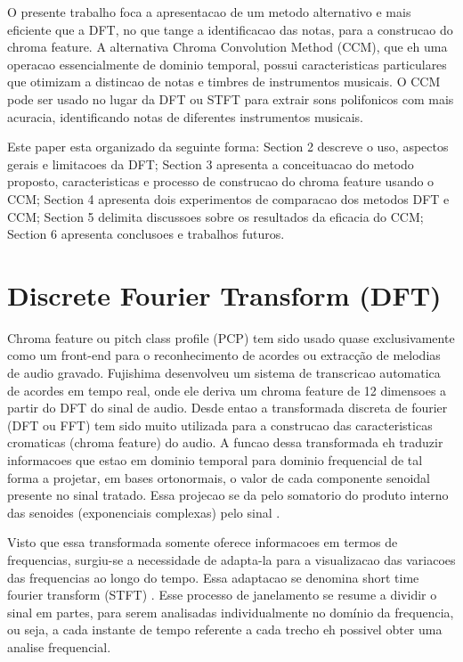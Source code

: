 \documentclass{article}
\begin{document}
	O presente trabalho foca a apresentacao de um metodo alternativo e mais eficiente que a DFT, no que tange a identificacao das notas, para a construcao do chroma feature. A alternativa Chroma Convolution Method (CCM), que eh uma operacao essencialmente de dominio temporal, possui caracteristicas particulares que otimizam a distincao de notas e timbres de instrumentos musicais. O CCM pode ser usado no lugar da DFT ou STFT para extrair sons polifonicos com mais acuracia, identificando notas de diferentes instrumentos musicais.

	Este paper esta organizado da seguinte forma: Section 2 descreve o uso, aspectos gerais e limitacoes da DFT; Section 3 apresenta a conceituacao do metodo proposto, caracteristicas e processo de construcao do chroma feature usando o CCM; Section 4 apresenta dois experimentos de comparacao dos metodos DFT e CCM; Section 5 delimita discussoes sobre os resultados da eficacia do CCM; Section 6 apresenta conclusoes e trabalhos futuros.

\section{Discrete Fourier Transform (DFT)}\label{sec:sfft}

	Chroma feature ou pitch class profile (PCP) tem sido usado quase exclusivamente como um front-end para o
	reconhecimento de acordes ou extracção de melodias de audio gravado. Fujishima \cite{fujishima1999realtime} desenvolveu um sistema de transcricao automatica de acordes em tempo real, onde ele deriva um chroma feature de 12 dimensoes a partir do DFT do sinal de audio. Desde entao a transformada discreta de fourier (DFT ou  FFT) tem sido muito utilizada para a construcao das caracteristicas cromaticas (chroma feature) do audio. A funcao dessa transformada eh traduzir informacoes que estao em dominio temporal para dominio frequencial de tal forma a projetar, em bases ortonormais, o valor de cada componente senoidal presente no sinal tratado. Essa projecao se da pelo somatorio do produto interno das senoides (exponenciais complexas) pelo sinal \cite{vaidyanathan1993multirate}.

	Visto que essa transformada somente oferece informacoes em termos de frequencias, surgiu-se a necessidade de adapta-la para a visualizacao das variacoes das frequencias ao longo do tempo. Essa adaptacao se denomina short time fourier transform (STFT) \cite{cohen1995time}. Esse processo de janelamento se resume a dividir o sinal em partes, para serem analisadas individualmente no domínio da frequencia, ou seja, a cada instante de tempo referente a cada trecho eh possivel obter uma analise frequencial.
\end{document}
